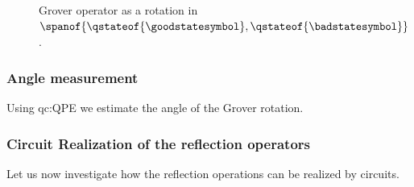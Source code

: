 \begin{figure}[t]
    \begin{center}
        
    \end{center}
    \caption{Grover operator as a rotation in $\spanof{\qstateof{\goodstatesymbol},\qstateof{\badstatesymbol}}$.}
    \label{fig:rotationSketch}
\end{figure}

\subsubsection{Angle measurement}

Using \gls{qc:QPE} we estimate the angle of the Grover rotation.

\subsubsection{Circuit Realization of the reflection operators}

Let us now investigate how the reflection operations can be realized by circuits.





